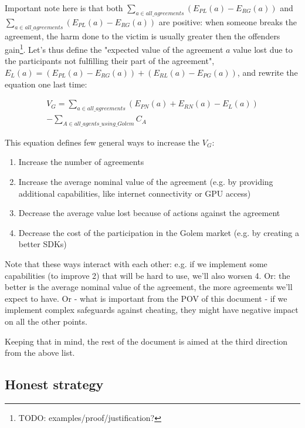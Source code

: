 \documentclass{article}
\begin{document}
Important note here is that both $\sum_{a \in all\_agreements}(E_{PL}(a)- E_{RG}(a))$ and $\sum_{a \in all\_agreements}(E_{PL}(a)- E_{RG}(a))$ are positive: 
when someone breaks the agreement, the harm done to the victim is usually greater then the offenders gain\footnote{TODO: examples/proof/justification?}.
Let's thus define the "expected value of the agreement $a$ value lost due to the participants not fulfilling their part of the agreement", 
$E_L(a) = (E_{PL}(a)- E_{RG}(a)) + (E_{RL}(a)- E_{PG}(a))$, and rewrite the equation one last time:

\begin{equation}
\begin{split}
    V_G = \sum_{a \in all\_agreements}(E_{PN}(a) + E_{RN}(a) - E_L(a)) \\
          - \sum_{A \in all\_agents\_using\_Golem}C_A
\end{split}
\end{equation}

This equation defines few general ways to increase the $V_G$:

\begin{enumerate}
\item Increase the number of agreements
\item Increase the average nominal value of the agreement (e.g. by providing additional capabilities, like internet connectivity or GPU access)
\item Decrease the average value lost because of actions against the agreement
\item Decrease the cost of the participation in the Golem market (e.g. by creating a better SDKs)
\end{enumerate}

Note that these ways interact with each other: e.g. if we implement some capabilities (to improve 2) that will be hard to use, we'll also worsen 4.
Or: the better is the average nominal value of the agreement, the more agreements we'll expect to have.
Or - what is important from the POV of this document - if we implement complex safeguards against cheating, they might have negative impact on all the other points.

Keeping that in mind, the rest of the document is aimed at the third direction from the above list.

\subsection{Honest strategy}
\end{document}
